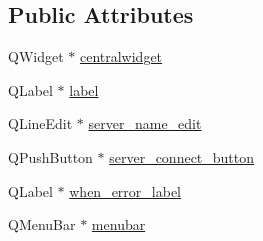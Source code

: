 \subsection*{Public Attributes}
\begin{DoxyCompactItemize}
\item 
Q\-Widget $\ast$ \hyperlink{classUi__server__connection__window_a9b76c80b2439ac5363c319758e13fdba}{centralwidget}
\item 
Q\-Label $\ast$ \hyperlink{classUi__server__connection__window_a96edc08348d65093b103b9d0b1eaa024}{label}
\item 
Q\-Line\-Edit $\ast$ \hyperlink{classUi__server__connection__window_a2d2674c180c60ce36dc7b01988779448}{server\-\_\-name\-\_\-edit}
\item 
Q\-Push\-Button $\ast$ \hyperlink{classUi__server__connection__window_a42b1801ba78d2d54b731f74a566d112b}{server\-\_\-connect\-\_\-button}
\item 
Q\-Label $\ast$ \hyperlink{classUi__server__connection__window_aaa93b479324f97d626b83f2286c298a8}{when\-\_\-error\-\_\-label}
\item 
Q\-Menu\-Bar $\ast$ \hyperlink{classUi__server__connection__window_abe650faec1c385db9a7ec4efa7f0bd88}{menubar}
\end{DoxyCompactItemize}


